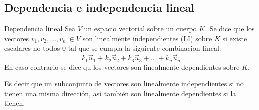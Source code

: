 \subsection*{Dependencia e independencia lineal}
\begin{Theorem*} {Dependencia lineal}
	Sea $V$ un espacio vectorial sobre un cuerpo $K$. Se dice que los vectores $v_1,v_2,\dots,v_n \ \in V$ son linealmente independientes (LI) sobre $K$ si existe escalares no todos $0$ tal que se cumpla la siguiente combinacion lineal:
	$$ k_1\vec{u}_1+k_2\vec{u}_2+k_3\vec{u}_3+\dots+k_n\vec{u}_n $$
	En caso contrario se dice qu los vectores son linealmente dependientes sobre $K$.
\end{Theorem*}
Es decir que un subconjunto de vectores son linealmente independientes si no tienen una misma dirección, así también son linealmente dependientes si la tienen.
